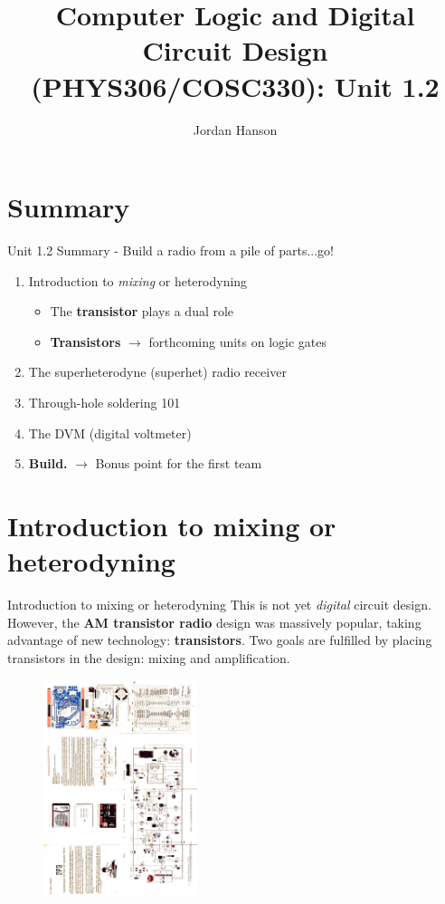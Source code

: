 \documentclass{beamer}
\title{Computer Logic and Digital Circuit Design (PHYS306/COSC330): Unit 1.2}
\author{Jordan Hanson}
\institute{Whittier College Department of Physics and Astronomy}
\begin{document}
\maketitle

\section{Summary}

\begin{frame}{Unit 1.2 Summary - Build a radio from a pile of parts...go!}
\begin{enumerate}
\item Introduction to \textit{mixing} or \alert{heterodyning}
\begin{itemize}
\item The \textbf{transistor} plays a dual role
\item \textbf{Transistors} $\rightarrow$ forthcoming units on logic gates
\end{itemize}
\item The superheterodyne (superhet) radio receiver
\item Through-hole soldering 101
\item The DVM (digital voltmeter)
\item \textbf{Build.} $\rightarrow$ Bonus point for the first team
\end{enumerate}
\end{frame}

\section{Introduction to mixing or heterodyning}

\begin{frame}{Introduction to mixing or heterodyning}
\small
This is not yet \textit{digital} circuit design.  However, the \textbf{AM transistor radio} design was massively popular, taking advantage of new technology: \textbf{transistors}.  Two goals are fulfilled by placing transistors in the design: mixing and amplification.
\begin{figure}
\centering
\includegraphics[width=0.4\textwidth,angle=270,trim=6.75cm 15cm 10.5cm 8cm,clip=true]{figures/2P3.pdf}
\end{figure}
\end{frame}
\end{document}
